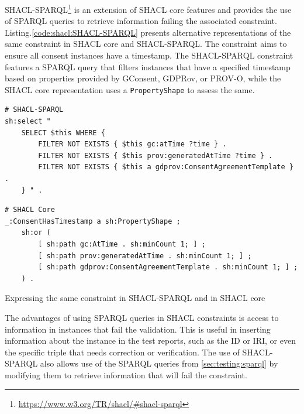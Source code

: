 SHACL-SPARQL\footnote{\url{https://www.w3.org/TR/shacl/\#shacl-sparql}} is an extension of SHACL core features and provides the use of SPARQL queries to retrieve information failing the associated constraint. Listing.\autoref{code:shacl:SHACL-SPARQL} presents alternative representations of the same constraint in SHACL core and SHACL-SPARQL.
The constraint aims to ensure all consent instances have a timestamp.
The SHACL-SPARQL constraint features a SPARQL query that filters instances that have a specified timestamp based on properties provided by GConsent, GDPRov, or PROV-O, while the SHACL core representation uses a \texttt{PropertyShape} to assess the same.
\begin{listing}[htbp]
\begin{verbatim}
# SHACL-SPARQL
sh:select "
    SELECT $this WHERE {
        FILTER NOT EXISTS { $this gc:atTime ?time } .
        FILTER NOT EXISTS { $this prov:generatedAtTime ?time } .
        FILTER NOT EXISTS { $this a gdprov:ConsentAgreementTemplate } .
    } " .
\end{verbatim}
\begin{verbatim}
# SHACL Core
_:ConsentHasTimestamp a sh:PropertyShape ;
    sh:or (
        [ sh:path gc:AtTime . sh:minCount 1; ] ;
        [ sh:path prov:generatedAtTime . sh:minCount 1; ] ;
        [ sh:path gdprov:ConsentAgreementTemplate . sh:minCount 1; ] ;
    ) .
\end{verbatim}
\caption{Expressing the same constraint in SHACL-SPARQL and in SHACL core}
\label{code:shacl:SHACL-SPARQL}
\end{listing}

The advantages of using SPARQL queries in SHACL constraints is access to information in instances that fail the validation. This is useful in inserting information about the instance in the test reports, such as the ID or IRI, or even the specific triple that needs correction or verification.
The use of SHACL-SPARQL also allows use of the SPARQL queries from \autoref{sec:testing:sparql} by modifying them to retrieve information that will fail the constraint.

